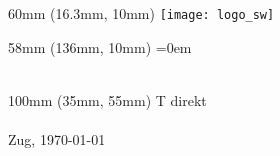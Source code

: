 

\thispagestyle{myheadings}

\iflogo%
\begin{textblock}{60mm\TPHorizModule} (16.3mm\TPHorizModule,
  10mm\TPVertModule)
  \texttt{[image: logo\_sw]}
\end{textblock}
\fi

\iforganisation%
\begin{textblock}{58mm\TPHorizModule} (136mm\TPHorizModule,
  10mm\TPVertModule)
  \parskip=0em%
  \fontsize{8}{9}\selectfont
  \CreatorDirektion\\
  \CreatorAmt\\
  \CreatorDienststelle%
\end{textblock}
\fi

\ifcontact%
\begin{textblock}{100mm\TPHorizModule} (35mm\TPHorizModule,
  55mm\TPVertModule)
  \vspace{-\parskip}%
  \fontsize{8}{9} \selectfont
  T direkt \CreatorPhone\\
  \CreatorEmail\\
  Zug, \today\\
\end{textblock}
\fi
\phantom{foo}\vspace{-2\baselineskip}
\vspace{22mm}
